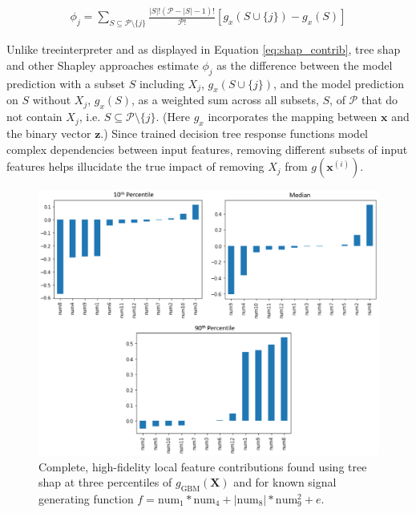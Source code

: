 \documentclass[11pt]{asaproc}
\begin{document}
\begin{equation}
\label{eq:shap_contrib}
\begin{aligned}
\phi_{j} = \sum_{S \subseteq \mathcal{P} \setminus \{j\}}\frac{|S|!(\mathcal{P} -|S| -1)!}{\mathcal{P}!}[g_x(S \cup \{j\}) - g_x(S)]
\end{aligned}
\end{equation}

\noindent Unlike treeinterpreter and as displayed in Equation \ref{eq:shap_contrib}, tree shap and other Shapley approaches estimate $\phi_j$ as the difference between the model prediction with a subset $S$ including $X_j$, $g_x(S \cup \{j\})$, and the model prediction on $S$ without $X_j$, $g_x(S)$, as a weighted sum across all subsets, $S$, of $\mathcal{P}$ that do not contain $X_j$, i.e. $S \subseteq \mathcal{P} \setminus \{j\}$. (Here $g_x$ incorporates the mapping between $\mathbf{x}$ and the binary vector $\mathbf{z}$.) Since trained decision tree response functions model complex dependencies between input features, removing different subsets of input features helps illucidate the true impact of removing $X_j$ from $g(\mathbf{x}^{(i)})$.

\begin{figure}[htb]
	\begin{center}
		\includegraphics[scale=0.6]{img/figure_6.eps}
		\caption{Complete, high-fidelity local feature contributions found using tree shap at three percentiles of $g_{\text{GBM}}(\mathbf{X})$ and for known signal generating function $f = \text{num} _1 * \text{num}_4 + |\text{num}_8| * \text{num}_9^2 + e$.}
		\label{fig:shap}
	\end{center}
\end{figure}
\end{document}
